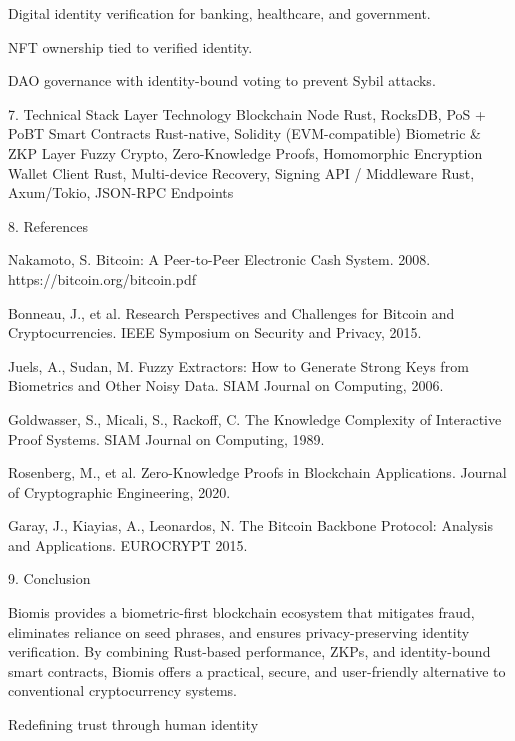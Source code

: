 Digital identity verification for banking, healthcare, and government.

NFT ownership tied to verified identity.

DAO governance with identity-bound voting to prevent Sybil attacks.

7. Technical Stack
Layer	Technology
Blockchain Node	Rust, RocksDB, PoS + PoBT
Smart Contracts	Rust-native, Solidity (EVM-compatible)
Biometric & ZKP Layer	Fuzzy Crypto, Zero-Knowledge Proofs, Homomorphic Encryption
Wallet Client	Rust, Multi-device Recovery, Signing
API / Middleware	Rust, Axum/Tokio, JSON-RPC Endpoints

8. References

Nakamoto, S. Bitcoin: A Peer-to-Peer Electronic Cash System. 2008. https://bitcoin.org/bitcoin.pdf

Bonneau, J., et al. Research Perspectives and Challenges for Bitcoin and Cryptocurrencies. IEEE Symposium on Security and Privacy, 2015.

Juels, A., Sudan, M. Fuzzy Extractors: How to Generate Strong Keys from Biometrics and Other Noisy Data. SIAM Journal on Computing, 2006.

Goldwasser, S., Micali, S., Rackoff, C. The Knowledge Complexity of Interactive Proof Systems. SIAM Journal on Computing, 1989.

Rosenberg, M., et al. Zero-Knowledge Proofs in Blockchain Applications. Journal of Cryptographic Engineering, 2020.

Garay, J., Kiayias, A., Leonardos, N. The Bitcoin Backbone Protocol: Analysis and Applications. EUROCRYPT 2015.

9. Conclusion

Biomis provides a biometric-first blockchain ecosystem that mitigates fraud, eliminates reliance on seed phrases, and ensures privacy-preserving identity verification. By combining Rust-based performance, ZKPs, and identity-bound smart contracts, Biomis offers a practical, secure, and user-friendly alternative to conventional cryptocurrency systems.

                                             Redefining trust through human identity